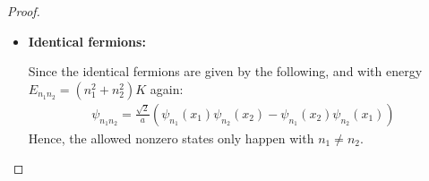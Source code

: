 \documentclass{article}
\begin{document}
\begin{proof}
\begin{itemize}
\begin{itemize}
            Since the identical bosons are given by the following, and with energy $E_{n_1n_2}=(n_1^2+n_2^2)K$ again:
            \begin{align}
                \psi_{n_1n_2} = \begin{cases}
                    \frac{\sqrt{2}}{a}\left(\psi_{n_1}(x_1)\psi_{n_2}(x_2)+\psi_{n_1}(x_2)\psi_{n_2}(x_1)\right) & n_1\neq n_2\\
                    \frac{2}{a}\psi_{n_1}(x_1)\psi+{n_2}(x_2) & n_1=n_2
                \end{cases}
            \end{align}
            With the case of $(n_1,n_2)=(1,1),(1,2),(2,1)$ being mentioned (corresponds to $n_1^2+n_2 = 2,5,5$, and the case $(1,2),(2,1)$ has identical wavefunctions), then the next two eigenvalues shold be related to $(n_1,n_2)=(2,2)$ (corresponds to $E_{22}=8K$), and $(n_1,n_2) = (1,3),(3,1)$ (correspond to $E_{13}=E_{31}=10K$). As a side note, $(1,3),(3,1)$ by symmtric tensor are the same. So, the informations are as below:
            \begin{align}
                &\text{Wave function: } \frac{2}{a}\sin\left(\frac{2\pi x_1}{a}\right)\sin\left(\frac{2\pi x_2}{a}\right),\quad \text{Eigenvalue: } E_{22} = 8K,\quad\text{Degeneracy: } 1
            \end{align}
            \begin{align}
                &\text{Wave function: } \frac{\sqrt{2}}{a}\left(\sin\left(\frac{\pi x_1}{a}\right)\sin\left(\frac{3\pi x_2}{a}\right)+\sin\left(\frac{3\pi x_1}{a}\right)\sin\left(\frac{\pi x_2}{a}\right)\right)\\
                &\text{Eigenvalue: } E_{13} = 10K,\quad\text{Degeneracy: } 1
            \end{align}

            \hfil

            \item \textbf{Identical fermions:}
            
            Since the identical fermions are given by the following, and with energy $E_{n_1n_2}=(n_1^2+n_2^2)K$ again:
            \begin{align}
                \psi_{n_1n_2} = \frac{\sqrt{2}}{a}\left(\psi_{n_1}(x_1)\psi_{n_2}(x_2)-\psi_{n_1}(x_2)\psi_{n_2}(x_1)\right)
            \end{align}
            Hence, the allowed nonzero states only happen with $n_1\neq n_2$.


\end{itemize}
\end{itemize}
\end{proof}
\end{document}
